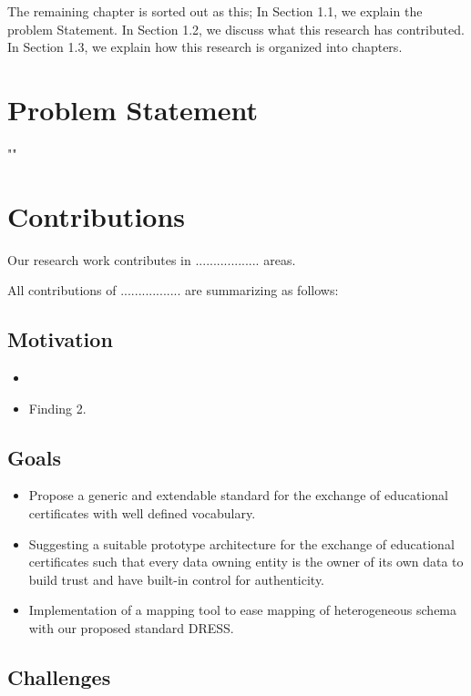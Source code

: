 \documentclass[12pt,a4paper,oneside]{book}
\begin{document}
The remaining chapter is sorted out as this; In Section 1.1, we explain the problem Statement. In Section 1.2, we discuss what this research has contributed. In Section 1.3, we explain how this research is organized into chapters.

\section{Problem Statement}\label{s-problem_statement}

""

\section{Contributions}\label{s-contributions}

Our research work contributes in .................. areas.

All contributions of ................. are summarizing as follows:

\subsection{Motivation}

\begin{itemize}
\item

\item
Finding 2.
\end{itemize}

\subsection{Goals}\label{s-goals}

\begin{itemize}
\item
Propose a generic and extendable standard for the exchange of educational certificates with well defined vocabulary.
\item
Suggesting a suitable prototype architecture for the exchange of educational certificates such that 
every data owning entity is the owner of its own data to build trust and have built-in control for authenticity.
\item
Implementation of a mapping tool to ease mapping of heterogeneous schema with our proposed standard DRESS.
\end{itemize}

\subsection{Challenges}\label{s-challenges}
\end{document}
